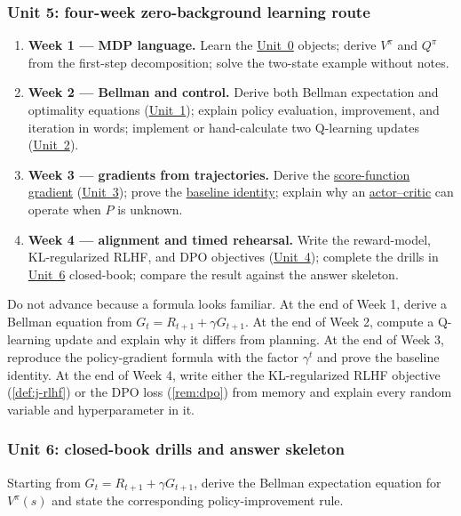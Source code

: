 \documentclass[11pt,a4paper]{article}
\newcommand{\jump}[2]{\hyperref[#1]{#2}}
\newcommand{\unitref}[1]{\hyperref[unit:#1]{Unit~#1}}
\theoremstyle{definition}
\begin{document}
\subsubsection{Unit 5: four-week zero-background learning route}
\label{unit:5}

\begin{enumerate}
    \item \textbf{Week 1 --- MDP language.} Learn the \unitref{0} objects; derive $V^\pi$ and
    $Q^\pi$ from the first-step decomposition; solve the two-state example without notes.
    \item \textbf{Week 2 --- Bellman and control.} Derive both Bellman expectation and
    optimality equations (\unitref{1}); explain policy evaluation, improvement, and iteration in words;
    implement or hand-calculate two Q-learning updates (\unitref{2}).
    \item \textbf{Week 3 --- gradients from trajectories.} Derive the
    \jump{eq:policy-gradient}{score-function gradient} (\unitref{3}); prove the
    \jump{thm:baseline}{baseline identity}; explain why an
    \jump{def:actor-critic}{actor--critic} can operate when $P$ is unknown.
    \item \textbf{Week 4 --- alignment and timed rehearsal.} Write the reward-model,
    KL-regularized RLHF, and DPO objectives (\unitref{4}); complete the drills in
    \unitref{6} closed-book; compare the result against the answer skeleton.
\end{enumerate}

\begin{note}
Do not advance because a formula looks familiar. At the end of Week 1, derive a Bellman
equation from $G_t=R_{t+1}+\gamma G_{t+1}$. At the end of Week 2, compute a Q-learning
update and explain why it differs from planning. At the end of Week 3, reproduce the
policy-gradient formula with the factor $\gamma^t$ and prove the baseline identity. At the
end of Week 4, write either the KL-regularized RLHF objective (\cref{def:j-rlhf}) or the
DPO loss (\cref{rem:dpo}) from memory
and explain every random variable and hyperparameter in it.
\end{note}

\subsubsection{Unit 6: closed-book drills and answer skeleton}
\label{unit:6}

\begin{exercise}
Starting from $G_t=R_{t+1}+\gamma G_{t+1}$, derive the Bellman expectation equation for
$V^\pi(s)$ and state the corresponding policy-improvement rule.
\end{exercise}
\end{document}
